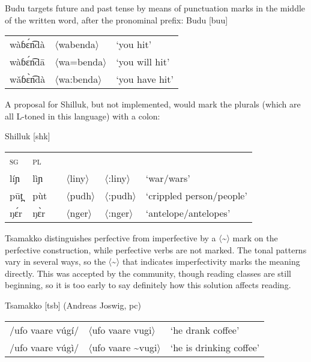 \documentclass[output=paper]{langscibook}
\begin{document}
Budu targets future and past tense by means of punctuation marks in the middle of the written word, after the pronominal prefix:
\ea
Budu [buu] \citep[8]{BamataSubama1997}

\begin{tabular}{@{}lll@{}}
wàɓɛ́n͡dà &		〈wabenda〉 	&	‘you hit’\\
wàɓɛ́n͡dā 	&	〈wa=benda〉& 	‘you will hit’  \\
wǎɓɛ̀n͡dà 	&	〈wa:benda〉&	‘you have hit’\\
\end{tabular}
\z

A proposal for Shilluk, but not implemented, would mark the plurals (which are all L-toned in this language) with a colon:
\ea

Shilluk [shk] \citep{Gilley2004}

\begin{tabular}{@{}llllll@{}}
\textsc{sg} & \textsc{pl} & { } & { } & { } \\ 
líɲ    & lìɲ 	& { } &	〈liny〉  &  〈:liny〉 & ‘war/wars’ \\
pūt̪  &   pùt & { } & 〈pudh〉 & 〈:pudh〉 &‘crippled person/people’    \\
ŋɛ́r &   ŋɛ̀r &	{ } &	〈nger〉  & 〈:nger〉     & ‘antelope/antelopes’ 	\\
\end{tabular}
\z

Tsamakko distinguishes perfective from imperfective by a 〈\sim〉 mark on the perfective construction, while perfective verbs are not marked. The tonal patterns vary in several ways, so the 〈\sim〉 that indicates imperfectivity marks the meaning directly. This was accepted by the community, though reading classes are still beginning, so it is too early to say definitely how this solution affects reading.  
\ea

Tsamakko [tsb]  (Andreas Joswig, pc)

\begin{tabular}{@{}lll@{}}
/ufo vaare vúgí/ &  〈ufo vaare vugi〉  &‘he drank coffee’ \\
/ufo vaare vúgì/ &  〈ufo vaare {\sim}vugi〉  &‘he is drinking coffee’\\
\end{tabular}
\z
\end{document}
